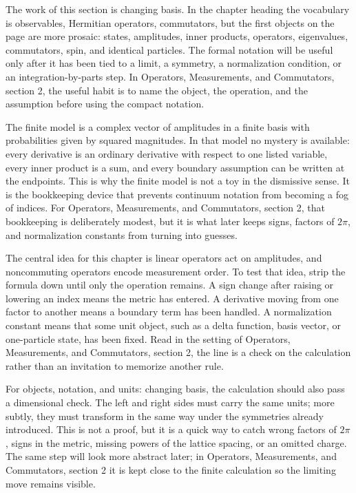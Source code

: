 The work of this section is changing basis.  In the chapter heading the vocabulary is observables, Hermitian operators, commutators, but the first objects on the page are more prosaic: states, amplitudes, inner products, operators, eigenvalues, commutators, spin, and identical particles.  The formal notation will be useful only after it has been tied to a limit, a symmetry, a normalization condition, or an integration-by-parts step.  In Operators, Measurements, and Commutators, section 2, the useful habit is to name the object, the operation, and the assumption before using the compact notation.

The finite model is a complex vector of amplitudes in a finite basis with probabilities given by squared magnitudes.  In that model no mystery is available: every derivative is an ordinary derivative with respect to one listed variable, every inner product is a sum, and every boundary assumption can be written at the endpoints.  This is why the finite model is not a toy in the dismissive sense.  It is the bookkeeping device that prevents continuum notation from becoming a fog of indices.  For Operators, Measurements, and Commutators, section 2, that bookkeeping is deliberately modest, but it is what later keeps signs, factors of \(2\pi\), and normalization constants from turning into guesses.

The central idea for this chapter is linear operators act on amplitudes, and noncommuting operators encode measurement order.  To test that idea, strip the formula down until only the operation remains.  A sign change after raising or lowering an index means the metric has entered.  A derivative moving from one factor to another means a boundary term has been handled.  A normalization constant means that some unit object, such as a delta function, basis vector, or one-particle state, has been fixed.  Read in the setting of Operators, Measurements, and Commutators, section 2, the line is a check on the calculation rather than an invitation to memorize another rule.

For objects, notation, and units: changing basis, the calculation should also pass a dimensional check.  The left and right sides must carry the same units; more subtly, they must transform in the same way under the symmetries already introduced.  This is not a proof, but it is a quick way to catch wrong factors of \(2\pi\), signs in the metric, missing powers of the lattice spacing, or an omitted charge.  The same step will look more abstract later; in Operators, Measurements, and Commutators, section 2 it is kept close to the finite calculation so the limiting move remains visible.

